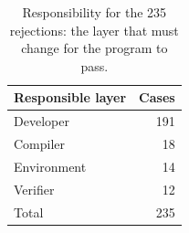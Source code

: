 \begin{table}[t]
  \centering
  \caption{Responsibility for the 235 rejections: the layer that must change for the program to pass.}
  \label{tab:responsibility}
  \small
  \begin{tabular}{@{}l r@{}}
    \toprule
    Responsible layer & Cases \\
    \midrule
    Developer    & 191 \\
    Compiler     & 18  \\
    Environment  & 14  \\
    Verifier     & 12  \\
    \midrule
    Total        & 235 \\
    \bottomrule
  \end{tabular}
\end{table}
